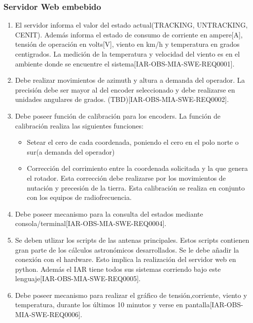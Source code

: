 \documentclass[12pt,a4paper, twosite]{article}
\begin{document}
	\subsubsection{Servidor Web embebido}
	\begin{enumerate}
		\item El servidor informa el valor del estado actual(TRACKING, UNTRACKING, CENIT). Además informa el estado de consumo de corriente en ampere[A], tensión de operación en volts[V], viento en km/h y temperatura en grados centigrados. La medición de la temperatura y velocidad del viento es en el ambiente donde se encuentre el sistema[IAR-OBS-MIA-SWE-REQ0001]. 
		\item Debe realizar movimientos de azimuth y altura a demanda del operador. La precisión debe ser mayor al del encoder seleccionado y debe realizarse en unidades angulares de grados. (TBD)[IAR-OBS-MIA-SWE-REQ0002].
		\item Debe poseer función de calibración para los encoders. La función de calibración realiza las siguientes funciones: 
			\begin{itemize}
				\item Setear el cero de cada coordenada, poniendo el cero en el polo norte o sur(a demanda del operador)
				\item Corrección del corrimiento entre la coordenada solicitada y la que genera el rotador. Esta corrección debe realizarse por los movimientos de nutación y precesión de la tierra.  Esta calibración se realiza en conjunto con los equipos de radiofrecuencia. 
				
			\end{itemize} 
		\item Debe poseer mecanismo para la consulta del estados mediante consola/terminal[IAR-OBS-MIA-SWE-REQ0004]. 
		\item Se deben utlizar los scripts de las antenas principales. Estos scripts contienen gran parte de los cálculos astronómicos desarrollados. Se le debe añadir la conexión con el hardware. Esto implica la realización del servidor web en python. Además el IAR tiene todos sus sistemas corriendo bajo este lenguaje[IAR-OBS-MIA-SWE-REQ0005].
		\item Debe poseer mecanismo para realizar el gráfico de tensión,corriente, viento y temperatura, durante los últimos 10 minutos y verse en pantalla[IAR-OBS-MIA-SWE-REQ0006].
	\end{enumerate}
\end{document}
